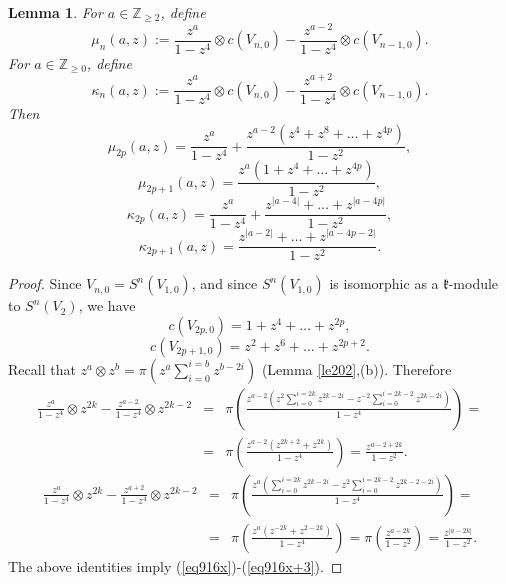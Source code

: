 \documentclass[12pt]{amsart}
\theoremstyle{plain} %
\newtheorem{lemma}[definition]{Lemma}
\newcommand {\ZZ} {\mathbb {Z}}
\newcommand{\kk}{\mathfrak{k}}
\newcommand{\refle}[1]{Lemma \ref{#1}}
\newcommand{\refeq}[1]{(\ref{#1})}
\begin{document}
\begin{lemma}\label{le915}
For $a\in\ZZ_{\geq 2}$, define
\[
\mu_n(a,z):=\frac{z^a}{1-z^4}\otimes c(V_{n,0})-\frac{z^{a-2}}{1-z^4}\otimes c(V_{n-1,0}).
\]
For $a\in\ZZ_{\geq 0}$, define
\[
\kappa_n(a,z):=\frac{z^a}{1-z^4}\otimes c(V_{n,0})-\frac{z^{a+2}}{1-z^4}\otimes c(V_{n-1,0}).
\]
Then
\begin{equation}\label{eq916x}
\mu_{2p}(a,z)=\frac{z^a}{1-z^4}+\frac{z^{a-2}(z^4+z^8+\dots+z^{4p})}{1-z^2},
\end{equation}
\begin{equation}\label{eq916x+1}
\mu_{2p+1}(a,z)=\frac{z^{a}(1+z^4+\dots+z^{4p})}{1-z^2},
\end{equation}
\begin{equation}\label{eq916x+2}
\kappa_{2p}(a,z)=\frac{z^a}{1-z^4}+\frac{z^{|a-4|}+\dots+z^{|a-4p|}}{1-z^2},
\end{equation}
\begin{equation}\label{eq916x+3}
\kappa_{2p+1}(a,z)=\frac{z^{|a-2|}+\dots+z^{|a-4p-2|}}{1-z^2}.
\end{equation}
\end{lemma}
\begin{proof}
Since $V_{n,0}=S^n(V_{1,0})$, and since $S^n(V_{1,0})$ is isomorphic as a $\kk$-module to $S^n(V_2)$, we have
\[
c(V_{2p,0})=1+z^4+\dots+z^{2p},
\]
\[
c(V_{2p+1,0})=z^2+z^6+\dots+z^{2p+2}.
\]
Recall that $z^a\otimes z^b=\pi(z^a\sum_{i=0}^{i=b}z^{b-2i})$ (\refle{le202},(b)). Therefore
\begin{eqnarray*}
\frac{z^a}{1-z^4}\otimes z^{2k}-\frac{z^{a-2}}{1-z^4}\otimes z^{2k-2}&=&\pi\left(\frac{z^{a-2}(z^2\sum\limits_{i=0}^{i=2k}z^{2k-2i}-z^{-2}\sum\limits_{i=0}^{i=2k-2}z^{2k-2i})}{1-z^4}\right)=\\
&=&\pi\left(\frac{z^{a-2}(z^{2k+2}+z^{2k})}{1-z^4}\right)=\frac{z^{a-2+2k}}{1-z^2}.
\end{eqnarray*}
\begin{eqnarray*}
\frac{z^a}{1-z^4}\otimes z^{2k}-\frac{z^{a+2}}{1-z^4}\otimes z^{2k-2}&=&\pi\left(\frac{z^{a}(\sum\limits_{i=0}^{i=2k}z^{2k-2i}-z^2\sum\limits_{i=0}^{i=2k-2}z^{2k-2-2i})}{1-z^4}\right)=\\
&=&\pi\left(\frac{z^{a}(z^{-2k}+z^{2-2k})}{1-z^4}\right)=\pi\left(\frac{z^{a-2k}}{1-z^2}\right)=\frac{z^{|a-2k|}}{1-z^2}.
\end{eqnarray*}
The above identities imply \refeq{eq916x}-\refeq{eq916x+3}.
\end{proof}
\end{document}
